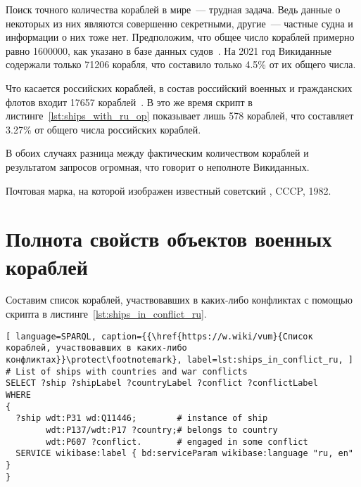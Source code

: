 \label{question:ship_1}

Поиск точного количества кораблей в мире~--- трудная задача. 
Ведь данные о некоторых из них являются совершенно секретными, другие~--- частные судна и информации о них тоже нет. 
Предположим, что общее число кораблей примерно равно \num{1600000}, 
как указано в базе данных судов~\autocite{FleetMon}. 
На 2021 год Викиданные содержали только \num{71206} корабля, что составило только 4.5\% от их общего числа.


Что касается российских кораблей, в состав российский военных и гражданских флотов входит \num{17657} кораблей~\autocite{RussianShips}. В это же время скрипт в листинге~\ref{lst:ships_with_ru_op} показывает лишь 578 кораблей, что составляет 3.27\% от общего числа российских кораблей. 

В обоих случаях разница между фактическим количеством кораблей и результатом запросов огромная, что говорит о неполноте Викиданных.

\label{question:ship_2}

\begin{marginfigure}[0.0cm]
  {
    \setlength{\fboxsep}{0pt}%
    \setlength{\fboxrule}{1pt}%
  }
  \caption[Известный советский миноносец.]{Почтовая марка, на которой изображен известный советский  , CCCP, 1982.}%
  \label{fig:grem_question}%
\end{marginfigure}

\section{Полнота свойств объектов военных кораблей}

Составим список кораблей, участвовавших в каких-либо конфликтах с помощью скрипта в листинге~\ref{lst:ships_in_conflict_ru}.

\begin{lstlisting}[ language=SPARQL, caption={{\href{https://w.wiki/vum}{Список кораблей, участвовавших в каких-либо конфликтах}}\protect\footnotemark}, label=lst:ships_in_conflict_ru, ]
# List of ships with countries and war conflicts
SELECT ?ship ?shipLabel ?countryLabel ?conflict ?conflictLabel
WHERE
{
  ?ship wdt:P31 wd:Q11446;        # instance of ship
        wdt:P137/wdt:P17 ?country;# belongs to country
        wdt:P607 ?conflict.       # engaged in some conflict
  SERVICE wikibase:label { bd:serviceParam wikibase:language "ru, en" }
}
\end{lstlisting}


